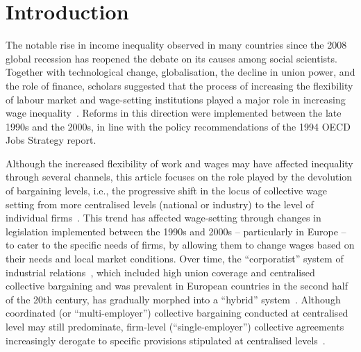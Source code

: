 \documentclass[12pt]{article}
\begin{document}
\cleardoublepage

\onehalfspacing

\section{Introduction}
\label{sec:intro}
The notable rise in income inequality observed in many countries since the 2008 global recession has reopened the debate on its causes among social scientists. 
Together with technological change, globalisation, the decline in union power, and the role of finance, scholars suggested that the process of increasing the flexibility of labour market and wage-setting institutions played a major role in increasing wage inequality~\citep{cobb2016}. Reforms in this direction were implemented between the late 1990s and the 2000s, in line with the policy recommendations of the 1994 OECD Jobs Strategy report.

Although the increased flexibility of work and wages may have affected inequality through several channels, this article focuses on the role played by the devolution of bargaining levels, i.e., the progressive shift in the locus of collective wage setting from more centralised levels (national or industry) to the level of individual firms~\citep{undy1978}. This trend has affected wage-setting through changes in legislation implemented between the 1990s and 2000s -- particularly in Europe -- to cater to the specific needs of firms, by allowing them to change wages based on their needs and local market conditions.
Over time, the “corporatist” system of industrial relations~\citep{wallerstein1997unions}, which included high union coverage and centralised collective bargaining and was prevalent in European countries in the second half of the 20th century, has gradually morphed into a “hybrid” system~\citep{Braakmann}. 
Although coordinated (or “multi-employer”) collective bargaining conducted at centralised level may still predominate, firm-level (“single-employer”)  collective agreements increasingly derogate to specific provisions stipulated at centralised levels~\citep{visser2013wage}.
\end{document}
